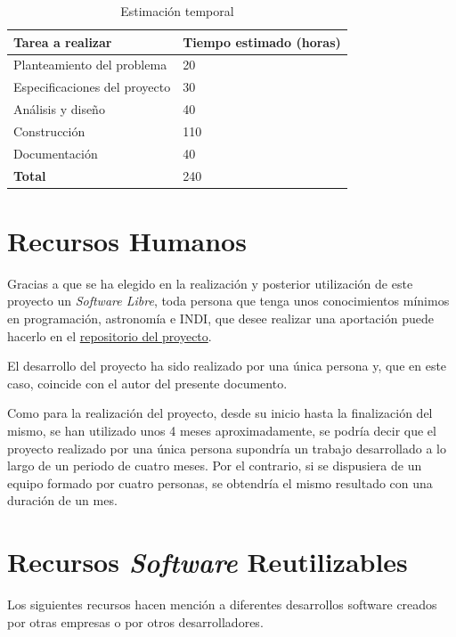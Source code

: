 \begin{table}[h]
\centering
\label{table:estimadobruto}
\begin{tabular}{ll}
\hline
{\bf Tarea a realizar}                   & {\bf Tiempo estimado (horas)} \\ \hline
Planteamiento del problema    & 20                            \\
Especificaciones del proyecto & 30                            \\
Análisis y diseño             & 40                            \\
Construcción                  & 110                           \\
Documentación                 & 40                            \\
{\bf Total}                   & 240                           \\ \hline
\end{tabular}
\caption{Estimación temporal}
\end{table}


\section{Recursos Humanos}
Gracias a que se ha elegido en la realización y posterior utilización de este proyecto un \textit{Software Libre}, toda persona que tenga unos conocimientos mínimos en programación, astronomía e INDI, que desee realizar una aportación puede hacerlo en el \href{https://github.com/PabloTorrecillas/IndiWebClient}{repositorio del proyecto}.

El desarrollo del proyecto ha sido realizado por una única persona y, que en este caso, coincide con el autor del presente documento.

Como para la realización del proyecto, desde su inicio hasta la finalización del mismo, se han utilizado unos 4 meses aproximadamente, se podría decir que el proyecto realizado por una única persona supondría un trabajo desarrollado a lo largo de un periodo de cuatro meses. Por el contrario, si se dispusiera de un equipo formado por cuatro personas, se obtendría el mismo resultado con una duración de un mes.

\section{Recursos \textit{Software} Reutilizables}
Los siguientes recursos hacen mención a diferentes desarrollos software creados por otras empresas o por otros desarrolladores.

